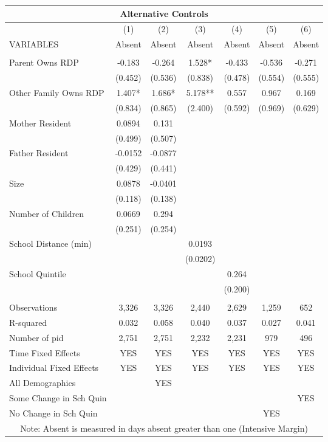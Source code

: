 \begin{tabular}{lcccccc}
\multicolumn{7}{c}{Alternative Controls} \\ \hline
 & (1) & (2) & (3) & (4) & (5) & (6) \\
VARIABLES & Absent & Absent & Absent & Absent & Absent & Absent \\ \hline
 &  &  &  &  &  &  \\
Parent Owns RDP & -0.183 & -0.264 & 1.528* & -0.433 & -0.536 & -0.271 \\
 & (0.452) & (0.536) & (0.838) & (0.478) & (0.554) & (0.555) \\
Other Family Owns RDP & 1.407* & 1.686* & 5.178** & 0.557 & 0.967 & 0.169 \\
 & (0.834) & (0.865) & (2.400) & (0.592) & (0.969) & (0.629) \\
Mother Resident & 0.0894 & 0.131 &  &  &  &  \\
 & (0.499) & (0.507) &  &  &  &  \\
Father Resident & -0.0152 & -0.0877 &  &  &  &  \\
 & (0.429) & (0.441) &  &  &  &  \\
Size & 0.0878 & -0.0401 &  &  &  &  \\
 & (0.118) & (0.138) &  &  &  &  \\
Number of Children & 0.0669 & 0.294 &  &  &  &  \\
 & (0.251) & (0.254) &  &  &  &  \\
School Distance (min) &  &  & 0.0193 &  &  &  \\
 &  &  & (0.0202) &  &  &  \\
School Quintile &  &  &  & 0.264 &  &  \\
 &  &  &  & (0.200) &  &  \\
 &  &  &  &  &  &  \\
Observations & 3,326 & 3,326 & 2,440 & 2,629 & 1,259 & 652 \\
R-squared & 0.032 & 0.058 & 0.040 & 0.037 & 0.027 & 0.041 \\
Number of pid & 2,751 & 2,751 & 2,232 & 2,231 & 979 & 496 \\
Time Fixed Effects & YES & YES & YES & YES & YES & YES \\
Individual Fixed Effects & YES & YES & YES & YES & YES & YES \\
All Demographics &  & YES &  &  &  &  \\
Some Change in Sch Quin &  &  &  &  &  & YES \\
 No Change in Sch Quin &  &  &  &  & YES &  \\ \hline
\multicolumn{7}{c}{ Note: Absent is measured in days absent greater than one (Intensive Margin)} \\
\end{tabular}
